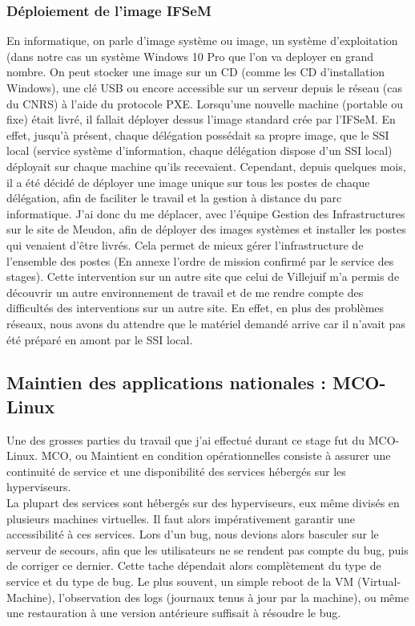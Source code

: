 \subsubsection{Déploiement de l'image IFSeM}
En informatique, on parle d'image système ou image, un système d'exploitation (dans notre cas un système Windows 10 Pro que l'on va deployer en grand nombre. On peut stocker une image sur un CD (comme les CD d'installation Windows), une clé USB ou encore accessible sur un serveur depuis le réseau (cas du CNRS) à l'aide du protocole PXE. 
\medbreak
Lorsqu'une nouvelle machine (portable ou fixe) était livré, il fallait déployer dessus l'image standard crée par l'IFSeM. En effet, jusqu'à présent, chaque délégation possédait sa propre image, que le SSI local (service système d'information, chaque délégation dispose d'un SSI local) déployait sur chaque machine qu'ils recevaient. Cependant, depuis quelques mois, il a été décidé de déployer une image unique sur tous les postes de chaque délégation, afin de faciliter le travail et la gestion à distance du parc informatique.
\medbreak
J'ai donc du me déplacer, avec l'équipe Gestion des Infrastructures sur le site de Meudon, afin de déployer des images systèmes et installer les postes qui venaient d'être livrés. Cela permet de mieux gérer l'infrastructure de l'ensemble des postes (En annexe l'ordre de mission confirmé par le service des stages). Cette intervention sur un autre site que celui de Villejuif m'a permis de découvrir un autre environnement de travail et de me rendre compte des difficultés des interventions sur un autre site. En effet, en plus des problèmes réseaux, nous avons du attendre que le matériel demandé arrive car il n'avait pas été préparé en amont par le SSI local. 

\subsection{Maintien des applications nationales : MCO-Linux}
Une des grosses parties du travail que j'ai effectué durant ce stage fut du MCO-Linux. MCO, ou Maintient en condition opérationnelles consiste à assurer une continuité de service et une disponibilité des services hébergés sur les hyperviseurs. \\
La plupart des services sont hébergés sur des hyperviseurs, eux même divisés en plusieurs machines virtuelles. Il faut alors impérativement garantir une accessibilité à ces services. Lors d'un bug, nous devions alors basculer sur le serveur de secours, afin que les utilisateurs ne se rendent pas compte du bug, puis de corriger ce dernier. Cette tache dépendait alors complètement du type de service et du type de bug. Le plus souvent, un simple reboot de la VM (Virtual-Machine), l'observation des logs (journaux tenus à jour par la machine), ou même une restauration à une version antérieure suffisait à résoudre le bug. 

